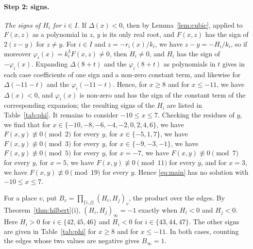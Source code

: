 \documentclass[11pt]{article}
\begin{document}
\paragraph{Step 2: signs.} \emph{The signs of $H_i$ for $i\in I$.} If $\Delta(x)<0$, then by Lemma~\ref{lem:cubic}, applied to $F(x,z)$ as a polynomial in $z$, $y$ is its only real root, and $F(x,z)$ has the sign of $2(z-y)$ for $z\neq y$. For $i\in I$ and $z=-r_i(x)/k_i$, we have $z-y=-H_i/k_i$, so if moreover $\varphi_i(x)=k_i^3F(x,z)\neq0$, then $H_i\neq0$, and $H_i$ has the sign of $-\varphi_i(x)$. Expanding $\Delta(8+t)$ and the $\varphi_i(8+t)$ as polynomials in $t$ gives in each case coefficients of one sign and a non-zero constant term, and likewise for $\Delta(-11-t)$ and the $\varphi_i(-11-t)$. Hence, for $x\geq8$ and for $x\leq-11$, we have $\Delta(x)<0$, and $\varphi_i(x)$ is non-zero and has the sign of the constant term of the corresponding expansion; the resulting signs of the $H_i$ are listed in Table~\ref{tab:phi}. It remains to consider $-10\leq x\leq7$. Checking the residues of $y$, we find that for $x\in\{-10,\allowbreak -8,\allowbreak -6,\allowbreak -4,\allowbreak -2,\allowbreak 0,\allowbreak 2,\allowbreak 4,\allowbreak 6\}$, we have $F(x,y)\not\equiv0\pmod{2}$ for every $y$, for $x\in\{-5,\allowbreak 1,\allowbreak 7\}$, we have $F(x,y)\not\equiv0\pmod{3}$ for every $y$, for $x\in\{-9,\allowbreak -3,\allowbreak -1\}$, we have $F(x,y)\not\equiv0\pmod{5}$ for every $y$, for $x=-7$, we have $F(x,y)\not\equiv0\pmod{7}$ for every $y$, for $x=5$, we have $F(x,y)\not\equiv0\pmod{11}$ for every $y$, and for $x=3$, we have $F(x,y)\not\equiv0\pmod{19}$ for every $y$. Hence \eqref{eq:main} has no solution with $-10\leq x\leq7$.

For a place $v$, put $B_v=\prod_{\{i,j\}}(H_i,H_j)_v$, the product over the edges. By Theorem~\ref{thm:hilbert}(i), $(H_i,H_j)_\infty=-1$ exactly when $H_i<0$ and $H_j<0$. Here $H_i>0$ for $i\in\{42,\allowbreak 45,\allowbreak 46\}$ and $H_i<0$ for $i\in\{43,\allowbreak 44,\allowbreak 47\}$. The other signs are given in Table~\ref{tab:phi} for $x\geq8$ and for $x\leq-11$. In both cases, counting the edges whose two values are negative gives $B_\infty=1$.
\end{document}
